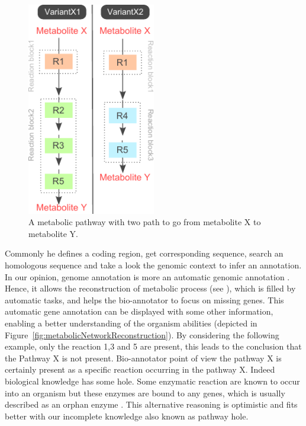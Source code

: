 \documentclass{llncs}
\begin{document}
\begin{figure}[H]
    \centering
    \includegraphics[width=0.5\textwidth]{img/metacycpathway.pdf}
    \caption{A metabolic pathway with two path to go from metabolite X to metabolite Y.}
    \label{fig:pathway}
\end{figure}

 Commonly he defines a coding region, get corresponding sequence, search an homologous sequence and take a look  the genomic context to infer an annotation. In our opinion,  genome annotation  is more  an automatic genomic annotation . Hence, it allows the reconstruction of  metabolic process (see \cite{francke2005reconstructing}), which is filled by automatic tasks, and helps the bio-annotator to focus on missing genes. This automatic gene annotation can be displayed with some other information,
enabling a better understanding of the organism abilities (depicted in Figure~\ref{fig:metabolicNetworkReconstruction}). By considering the following example, only the reaction 1,3 and 5 are present, this leads to the conclusion that the Pathway X is not present.  Bio-annotator point of view the pathway X is certainly present as a specific reaction occurring in the pathway X. Indeed\added{,} biological knowledge has some hole. Some enzymatic reaction are known to occur into an organism but these enzymes are bound to any genes, which is usually described as an orphan enzyme \cite{sorokina2014profiling}. This alternative reasoning is optimistic and fits better with our incomplete knowledge also known as pathway hole.
\end{document}
